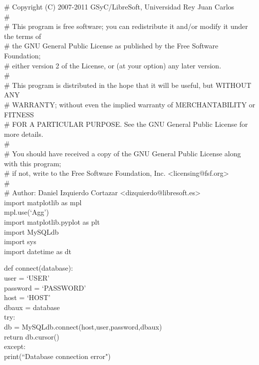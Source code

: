 \documentclass[a4paper, 12pt]{book}
\begin{document}
\# Copyright (C) 2007-2011  GSyC/LibreSoft, Universidad Rey Juan Carlos\\
\#\\
\# This program is free software; you can redistribute it and/or modify it under the terms of \\
\# the GNU General Public License as published by the Free Software Foundation; \\
\# either version 2 of the License, or (at your option) any later version.\\
\#\\
\# This program is distributed in the hope that it will be useful, but WITHOUT ANY \\
\# WARRANTY; without even the implied warranty of MERCHANTABILITY or FITNESS \\
\# FOR A PARTICULAR PURPOSE. See the GNU General Public License for more details.\\
\#\\
\# You should have received a copy of the GNU General Public License along with this program; \\
\# if not, write to the Free Software Foundation, Inc. \textless licensing@fsf.org\textgreater \\
\#\\
\# Author: Daniel Izquierdo Cortazar \textless dizquierdo@libresoft.es\textgreater \\

\noindent import matplotlib as mpl\\
mpl.use(`Agg')\\
import matplotlib.pyplot as plt\\
import MySQLdb\\
import sys\\
import datetime as dt\bigskip

\noindent def connect(database):\\
   \indent user = `USER'\\
   \indent password = `PASSWORD'\\
   \indent host = `HOST'\\

   \indent dbaux = database\\
   \indent try:\\
   \indent \indent db =  MySQLdb.connect(host,user,password,dbaux)\\
   \indent \indent return db.cursor()\\
   \indent except:\\
   \indent \indent print(``Database connection error")\\
\end{document}
